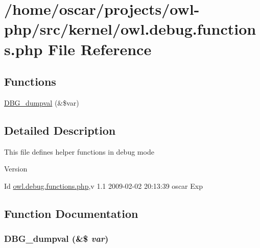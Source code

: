 \section{/home/oscar/projects/owl-\/php/src/kernel/owl.debug.functions.php File Reference}
\label{owl_8debug_8functions_8php}
\subsection*{Functions}
\begin{DoxyCompactItemize}
\item 
\hyperlink{owl_8debug_8functions_8php_a65a2d146de0c2b3a89eb4c118a88905f}{DBG\_\-dumpval} (\&\$var)
\end{DoxyCompactItemize}


\subsection{Detailed Description}
This file defines helper functions in debug mode \begin{DoxyVersion}{Version}

\end{DoxyVersion}
\begin{DoxyParagraph}{Id}
\hyperlink{owl_8debug_8functions_8php}{owl.debug.functions.php},v 1.1 2009-\/02-\/02 20:13:39 oscar Exp 
\end{DoxyParagraph}


\subsection{Function Documentation}
\subsubsection[{DBG\_\-dumpval}]{\setlength{\rightskip}{0pt plus 5cm}DBG\_\-dumpval (\&\$ {\em var})}\label{owl_8debug_8functions_8php_a65a2d146de0c2b3a89eb4c118a88905f}
